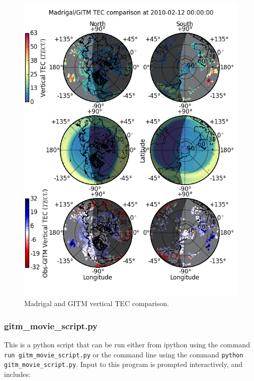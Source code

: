 \begin{figure}
\begin{center}
\noindent\includegraphics[width=.9 \textwidth]{Figures/gitm_tec_comp.png}
\caption{Madrigal and GITM vertical TEC comparison.}
\label{teccomp.fig}
\end{center}
\end{figure}

\subsubsection{gitm\_movie\_script.py}

This is a python script that can be run either from ipython using the command {\tt run gitm\_movie\_script.py} or the command line using the command {\tt python gitm\_movie\_script.py}.  Input to this program is prompted interactively, and includes:

